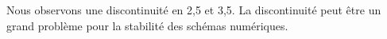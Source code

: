 Nous observons une discontinuité en 2,5 et 3,5. La discontinuité peut être un grand problème pour la stabilité des schémas numériques.

